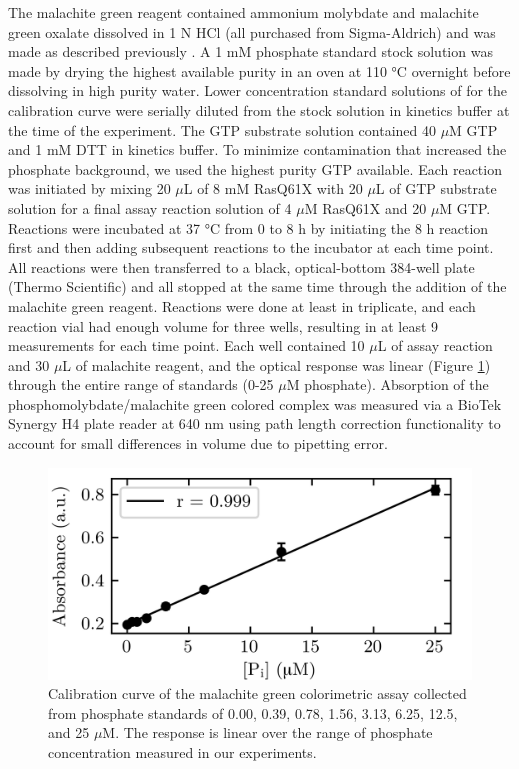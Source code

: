 The malachite green reagent contained ammonium molybdate and malachite green oxalate dissolved in 1 N HCl (all purchased from Sigma-Aldrich) and was made as described previously \cite{Quan2005}.
A 1 mM phosphate standard stock solution was made by drying the highest available purity  in an oven at 110 \si{\celsius} overnight before dissolving in high purity water. 
Lower concentration standard solutions of  for the calibration curve were serially diluted from the stock solution in kinetics buffer at the time of the experiment. 
The GTP substrate solution contained 40 $\mu$M GTP and 1 mM DTT in kinetics buffer. 
To minimize contamination that increased the phosphate background, we used the highest purity GTP available. 
Each reaction was initiated by mixing 20 $\mu$L of 8 mM RasQ61X with 20 $\mu$L of GTP substrate solution for a final assay reaction solution of 4 $\mu$M RasQ61X and 20 $\mu$M GTP. 
Reactions were incubated at 37 \si{\celsius} from 0 to 8 h by initiating the 8 h reaction first and then adding subsequent reactions to the incubator at each time point. 
All reactions were then transferred to a black, optical-bottom 384-well plate (Thermo Scientific) and all stopped at the same time through the addition of the malachite green reagent. 
Reactions were done at least in triplicate, and each reaction vial had enough volume for three wells, resulting in at least 9 measurements for each time point. 
Each well contained 10 $\mu$L of assay reaction and 30 $\mu$L of malachite reagent, and the optical response was linear (Figure \ref{fig:ras-response}) through the entire range of standards (0-25 $\mu$M phosphate). 
Absorption of the phosphomolybdate/malachite green colored complex was measured via a BioTek Synergy H4 plate reader at 640 nm using path length correction functionality to account for small differences in volume due to pipetting error.

\begin{figure}
    \center
    \includegraphics[width=\single]{figures-ras/optical_response.png}
    \caption{
        Calibration curve of the malachite green colorimetric assay collected from phosphate standards of 0.00, 0.39, 0.78, 1.56, 3.13, 6.25, 12.5, and 25 $\mu$M. 
        The response is linear over the range of phosphate concentration measured in our experiments.
    }
    \label{fig:ras-response}

\end{figure}

